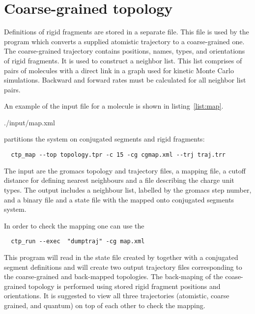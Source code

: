 \section{Coarse-grained topology}
\label{sec:coarsegrained}

Definitions of rigid fragments are stored in a separate \xml file. This file is used by the program \ctpmap which converts a supplied atomistic trajectory to a coarse-grained one. The coarse-grained trajectory contains positions, names, types, and orientations of rigid fragments. It is used to construct a neighbor list. This list comprises of pairs of molecules with a direct link in a graph used for kinetic Monte Carlo simulations. Backward and forward rates must be calculated for all neighbor list pairs.  

An example of the input file for a \dcvt molecule is shown in listing~\ref{list:map}. 

\clearpage

%
{./input/map.xml}


\ctpmap partitions the system on conjugated segments and rigid fragments:
\begin{verbatim}
  ctp_map --top topology.tpr -c 15 -cg cgmap.xml --trj traj.trr
\end{verbatim}
The input are the gromacs topology and trajectory files, a mapping file, a cutoff distance for defining nearest neighbours and a file describing the charge unit types. The output includes a neighbour list, labelled by the gromacs step number, and a binary 
file and a state file with the mapped onto conjugated segments system. 

In order to check the mapping one can use the  \calculator
\begin{verbatim}
  ctp_run --exec  "dumptraj" -cg map.xml 
\end{verbatim}

This program will read in the state file created by \ctpmap together with a conjugated segment definitions and will create two output trajectory files corresponding to the coarse-grained and back-mapped topologies. The back-maping of the coase-grained topology is performed using stored rigid fragment positions and orientations. It is suggested to view all three trajectories (atomistic, coarse grained, and quantum) on top of each other to check the mapping.


% 
